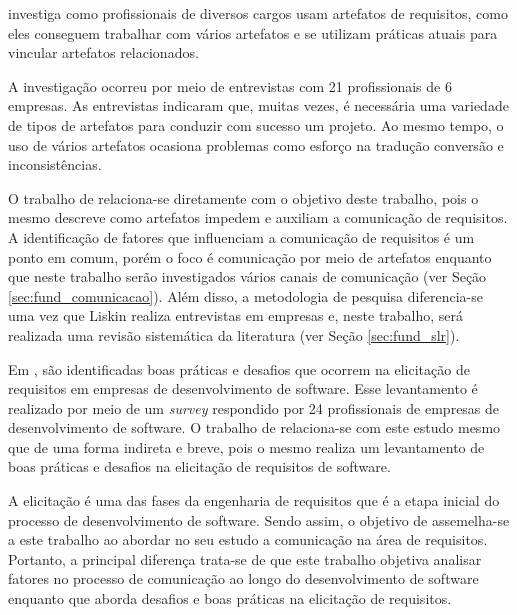     
      investiga como profissionais de diversos cargos usam artefatos de requisitos, como eles conseguem trabalhar com vários artefatos e se utilizam práticas atuais para vincular artefatos relacionados. 
    
    A investigação ocorreu por meio de entrevistas com 21 profissionais de 6 empresas. As entrevistas indicaram que, muitas vezes, é necessária uma variedade de tipos de artefatos para conduzir com sucesso um projeto. Ao mesmo tempo, o uso de vários artefatos ocasiona problemas como esforço na tradução conversão e inconsistências.
    
    O trabalho de   relaciona-se diretamente com o objetivo deste trabalho, pois o mesmo descreve como artefatos impedem e auxiliam a comunicação de requisitos.     A identificação de fatores que influenciam a comunicação de requisitos é um ponto em comum, porém o foco é comunicação por meio de artefatos enquanto que neste trabalho serão investigados vários canais de comunicação (ver Seção \ref{sec:fund_comunicacao}). Além disso,  a metodologia de pesquisa diferencia-se uma vez que Liskin realiza entrevistas em empresas e, neste trabalho, será realizada uma revisão sistemática da literatura (ver Seção \ref{sec:fund_slr}). 
  
   Em , são identificadas boas práticas e desafios que ocorrem  na  elicitação  de  requisitos  em  empresas  de  desenvolvimento  de  software. Esse levantamento é realizado por meio de um \emph{survey} respondido por 24 profissionais de empresas  de  desenvolvimento  de  software. O trabalho de  relaciona-se com este estudo mesmo que de uma forma indireta e breve, pois o mesmo realiza um levantamento de boas práticas e desafios na elicitação de requisitos de software. 
   
   A elicitação é uma das fases da engenharia de requisitos que é a etapa inicial do processo de desenvolvimento de software. Sendo assim, o objetivo de  assemelha-se a este trabalho ao abordar no seu estudo a comunicação na área de requisitos. Portanto, a principal diferença trata-se de que este trabalho objetiva analisar fatores no processo de comunicação ao longo do desenvolvimento de software enquanto que  aborda desafios e boas práticas na elicitação de requisitos.
    
